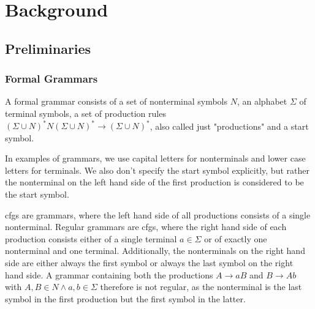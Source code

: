 \chapter{Background}
\label{chapter:Background}
\begin{comment}
What is the knowledge a undergrad student needs so that he/she can understand
your thesis? You can assume some familiarity with the very broad topic. E.g. if
you write a thesis in the area of software analysis, you do not have to explain
static/dynamic analysis as such (this is boring!). If you're a crypto guy, don't
explain AES in detail unless you try to break it in your thesis. If I stumble
across a word/term in your thesis and don't understand it, this is where I would
look it up (or on google).

Probably approx. 3-10 pages
\end{comment}

\section{Preliminaries}

\subsection{Formal Grammars}

A formal grammar consists of a set of nonterminal symbols $N$, an alphabet $\Sigma$ of terminal symbols, a set of production rules $(\Sigma \cup N)^*N(\Sigma \cup N)^* \rightarrow (\Sigma \cup N)^*$, also called just "productions" and a start symbol.

In examples of grammars, we use capital letters for nonterminals and lower case letters for terminals. We also don't specify the start symbol explicitly, but rather the nonterminal on the left hand side of the first production is considered to be the start symbol.

\acfp{cfg} are grammars, where the left hand side of all productions consists of a single nonterminal.
Regular grammars are \acp{cfg}, where the right hand side of each production consists either of a single terminal $a \in \Sigma$ or of exactly one nonterminal and one terminal. Additionally, the nonterminals on the right hand side are either always the first symbol or always the last symbol on the right hand side. A grammar containing both the productions $A \rightarrow aB$ and $B \rightarrow Ab$ with $A, B \in N \land a, b \in \Sigma$ therefore is not regular, as the nonterminal is the last symbol in the first production but the first symbol in the latter.

